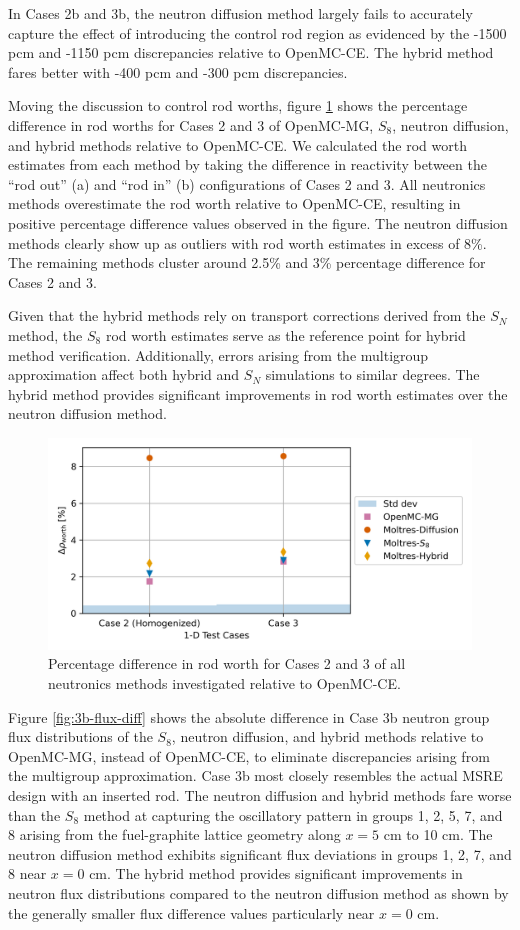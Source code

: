 \documentclass[letterpaper]{mc2025}
\begin{document}
In Cases 2b and 3b, the neutron diffusion method largely fails to accurately capture the
effect of introducing the control rod region as evidenced by the -1500 pcm and -1150 pcm
discrepancies relative to OpenMC-CE. The hybrid method fares better with -400 pcm and -300 pcm
discrepancies.

Moving the discussion to control rod worths, figure \ref{fig:1d-worth} shows the percentage
difference in rod worths for Cases 2 and 3 of OpenMC-MG, $S_8$, neutron diffusion, and hybrid
methods relative to OpenMC-CE. We calculated the rod worth estimates from each method by taking the
difference in reactivity between the ``rod out'' (a) and ``rod in'' (b) configurations of Cases 2
and 3. All neutronics methods overestimate the rod worth relative to OpenMC-CE, resulting in
positive percentage difference values observed in the figure.
The neutron diffusion methods clearly show up as outliers with rod worth estimates in excess
of 8\%. The remaining methods cluster around 2.5\% and 3\% percentage difference for Cases
2 and 3.

Given that the hybrid methods rely on transport corrections derived from the $S_N$ method, the
$S_8$ rod worth estimates serve as the
reference point for hybrid method verification. Additionally, errors arising from the multigroup
approximation affect both hybrid and $S_N$ simulations to similar degrees. The hybrid method
provides significant improvements in rod worth estimates over the neutron diffusion method.
%
\begin{figure}[htb!]
  \centering
  \includegraphics[width=0.8\columnwidth]{worth}
  \caption{Percentage difference in rod worth for Cases 2 and 3 of all neutronics methods
  investigated relative to OpenMC-CE.}
  \label{fig:1d-worth}
\end{figure}

Figure \ref{fig:3b-flux-diff} shows the absolute
difference in Case 3b neutron group flux distributions of the $S_8$, neutron diffusion, and
hybrid methods relative to OpenMC-MG, instead of OpenMC-CE, to eliminate discrepancies arising from
the multigroup approximation. Case 3b most closely resembles the actual \gls{MSRE} design with an
inserted rod.
The neutron diffusion and hybrid methods fare worse than the $S_8$ method at capturing the
oscillatory pattern in groups 1, 2, 5, 7, and 8 arising from the fuel-graphite lattice geometry
along $x=5$ cm to 10 cm. The neutron diffusion method
exhibits significant flux deviations in groups 1, 2, 7, and 8 near $x=0$ cm. The hybrid method
provides significant improvements in neutron flux distributions compared to the neutron diffusion
method as shown by the generally smaller flux difference values particularly near $x=0$ cm.
\end{document}

